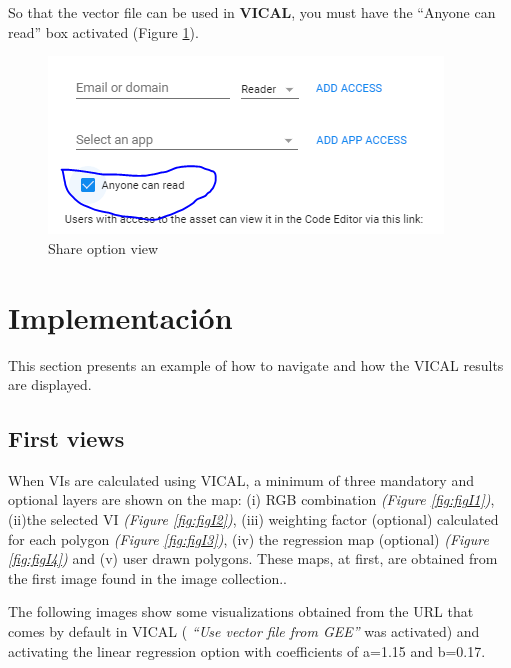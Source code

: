 \documentclass[
]{book}
\begin{document}
So that the vector file can be used in \textbf{VICAL}, you must have the ``Anyone can read'' box activated (Figure \ref{fig:figG13}).

\begin{figure}

{\centering \includegraphics[width=0.75\linewidth]{./images/Figure6} 

}

\caption{Share option view}\label{fig:figG13}
\end{figure}

\hypertarget{implementaciuxf3n}{%
\chapter{Implementación}\label{implementaciuxf3n}}

This section presents an example of how to navigate and how the VICAL results are displayed.

\hypertarget{PriVis}{%
\section{First views}\label{PriVis}}

When VIs are calculated using VICAL, a minimum of three mandatory and optional layers are shown on the map: (i) RGB combination \emph{(Figure \ref{fig:figI1})}, (ii)the selected VI \emph{(Figure \ref{fig:figI2})}, (iii) weighting factor (optional) calculated for each polygon \emph{(Figure \ref{fig:figI3})}, (iv) the regression map (optional) \emph{(Figure \ref{fig:figI4})} and (v) user drawn polygons. These maps, at first, are obtained from the first image found in the image collection..

The following images show some visualizations obtained from the URL that comes by default in VICAL ( \emph{``Use vector file from GEE''} was activated) and activating the linear regression option with coefficients of a=1.15 and b=0.17.
\end{document}
